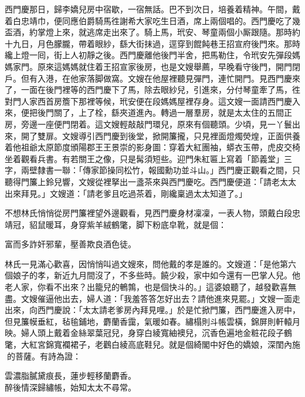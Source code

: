 西門慶那日，歸李嬌兒房中宿歇，一宿無話。巴不到次日，培養着精神。{}午間，戴着白忠靖巾，便同應伯爵騎馬徃謝希大家吃生日酒，席上兩個唱的。西門慶吃了幾盃酒，約掌燈上來，就逃席走出來了。騎上馬，玳安、琴童兩個小厮跟隨。那時約十九日，月色朦朧，帶着眼紗，繇大街抹過，逕穿到餛飩巷王招宣府後門來。那時纔上燈一囘，街上人初靜之後。西門慶離他後門半舍，把馬勒住，令玳安先彈段媽媽家門。原來這媽媽就住着王招宣家後房，也是文嫂舉薦，早晚看守後門，開門閉戶。但有入港，在他家落脚做窩。文嫂在他屋裡聽見彈門，連忙開門。見西門慶來了，一面在後門裡等的西門慶下了馬，除去眼紗兒，引進來，分付琴童牽了馬，徃對門人家西首房簷下那裡等候，玳安便在段媽媽屋裡存身。這文嫂一面請西門慶入來，便把後門關了，上了栓，繇夾道進內。轉過一層羣房，就是太太住的五間正房，旁邊一座便門閉着。這文嫂輕敲敲門環兒，原來有個聽頭。少頃，見一丫鬟出來，開了雙扉。文嫂導引西門慶到後堂，掀開簾攏，只見裡面燈燭熒煌，正面供養着他祖爺太原節度頒陽郡王王景崇的影身圖：穿着大紅團袖，蟒衣玉帶，虎皮交椅坐着觀看兵書。有若關王之像，{}只是髯須短些。迎門朱紅匾上寫着「節義堂」三字，兩壁隸書一聯：「傳家節操同松竹，{}報國勳功並斗山。」西門慶正觀看之間，只聽得門簾上鈴兒響，文嫂從裡拏出一盞茶來與西門慶吃。西門慶便道：「請老太太出來拜見。」文嫂道：「請老爹且吃過茶着，剛纔稟過太太知道了。」

不想林氏悄悄從房門簾裡望外邊觀看，見西門慶身材凜凜，一表人物，頭戴白段忠靖冠，貂鼠暖耳，身穿紫羊絨鶴氅，脚下粉底皁靴，就是個：

\begin{myquote} 
富而多詐奸邪輩，壓善欺良酒色徒。
\end{myquote} 

林氏一見滿心歡喜，因悄悄叫過文嫂來，問他戴的孝是誰的。文嫂道：「是他第六個娘子的孝，新近九月間沒了，不多些時。饒少殺，家中如今還有一巴掌人兒。他老人家，你看不出來？出籠兒的鵪鶉，也是個快斗的。」{}這婆娘聽了，越發歡喜無盡。文嫂催逼他出去，婦人道：「我羞答答怎好出去？請他進來見罷。」{}文嫂一面走出來，向西門慶說：「太太請老爹房內拜見哩。」於是忙掀門簾，西門慶進入房中，但見簾幙垂紅，毡毺鋪地，麝蘭香靄，氣暖如春。繡榻則斗帳雲橫，錦屏則軒轅月映。婦人頭上戴着金絲翠葉冠兒，身穿白綾寬紬襖兒，沉香色遍地金粧花段子鶴氅，大紅宮錦寬襴裙子，老鸛白綾高底鞋兒。就是個綺閣中好色的嬌娘，深閨內施𣭈的菩薩。有詩為證：

\begin{myquote} 
雲濃脂膩黛痕長，蓮步輕移蘭麝香。\\
醉後情深歸繡帳，始知太太不尋常。{}
\end{myquote} 

